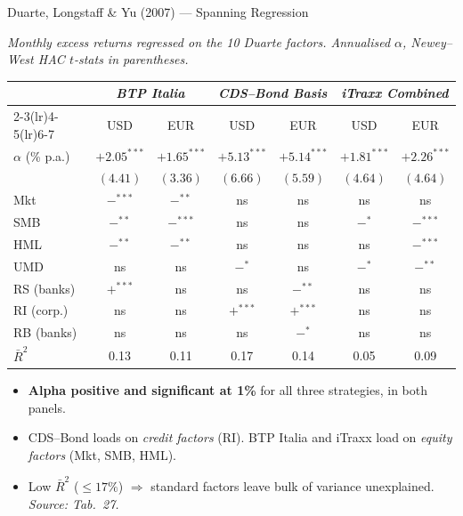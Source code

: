 \documentclass[aspectratio=169,11pt]{beamer}
\newcommand{\hlt}[1]{\textcolor{edhecred}{\textbf{#1}}}     %
\begin{document}
\begin{frame}[t]{Duarte, Longstaff \& Yu (2007) --- Spanning Regression}
\centering
\scriptsize
\vspace{0.05cm}

\textit{Monthly excess returns regressed on the 10 Duarte factors.
Annualised $\alpha$, Newey--West HAC $t$-stats in parentheses.}

\vspace{0.20cm}
\renewcommand{\arraystretch}{0.95}
\setlength{\tabcolsep}{4pt}

\begin{tabular}{lcccccc}
\toprule
 & \multicolumn{2}{c}{\textit{BTP Italia}}
 & \multicolumn{2}{c}{\textit{CDS--Bond Basis}}
 & \multicolumn{2}{c}{\textit{iTraxx Combined}} \\
\cmidrule(lr){2-3}\cmidrule(lr){4-5}\cmidrule(lr){6-7}
 & USD & EUR & USD & EUR & USD & EUR \\
\midrule
$\alpha$ (\% p.a.)  & \hlt{$+2.05^{***}$} & \hlt{$+1.65^{***}$}
                    & \hlt{$+5.13^{***}$} & \hlt{$+5.14^{***}$}
                    & \hlt{$+1.81^{***}$} & \hlt{$+2.26^{***}$} \\
                    & $(4.41)$ & $(3.36)$ & $(6.66)$ & $(5.59)$ & $(4.64)$ & $(4.64)$ \\
\addlinespace
Mkt        & $-^{***}$ & $-^{**}$ & ns & ns & ns & ns \\
SMB        & $-^{**}$ & $-^{***}$ & ns & ns & $-^{*}$ & $-^{***}$ \\
HML        & $-^{**}$ & $-^{**}$ & ns & ns & ns & $-^{***}$ \\
UMD        & ns & ns & $-^{*}$ & ns & $-^{*}$ & $-^{**}$ \\
RS (banks) & $+^{***}$ & ns & ns & $-^{**}$ & ns & ns \\
RI (corp.) & ns & ns & $+^{***}$ & $+^{***}$ & ns & ns \\
RB (banks) & ns & ns & ns & $-^{*}$ & ns & ns \\
\addlinespace
$\bar R^2$ & 0.13 & 0.11 & 0.17 & 0.14 & 0.05 & 0.09 \\
\bottomrule
\end{tabular}

\vspace{0.30cm}

\begin{itemize}\itemsep=0.06cm\footnotesize
  \item \hlt{Alpha positive and significant at 1\%} for all three strategies, in both panels.
  \item CDS--Bond loads on \emph{credit factors} (RI). BTP Italia and iTraxx load on \emph{equity factors} (Mkt, SMB, HML).
  \item Low $\bar R^2$ ($\leq\!17\%$) $\Rightarrow$ standard factors leave bulk of variance unexplained. \emph{Source: Tab.\ 27.}
\end{itemize}

\end{frame}
\end{document}
